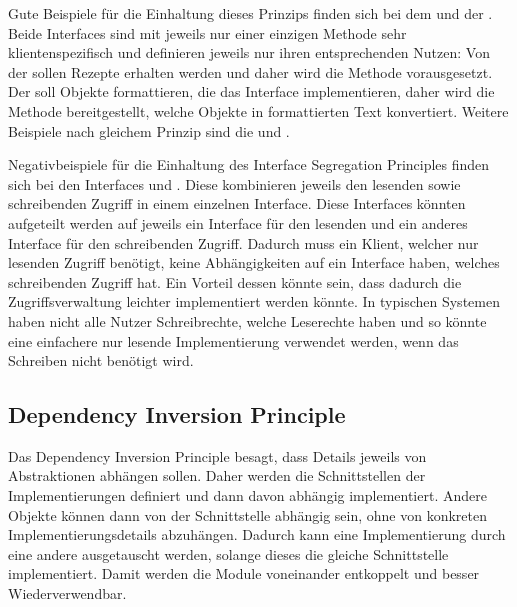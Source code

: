 Gute Beispiele für die Einhaltung dieses Prinzips finden sich bei dem  und der . Beide Interfaces sind mit jeweils nur einer einzigen Methode sehr klientenspezifisch und definieren jeweils nur ihren entsprechenden Nutzen: Von der  sollen Rezepte erhalten werden und daher wird die Methode  vorausgesetzt. Der  soll Objekte formattieren, die das Interface  implementieren, daher wird die Methode  bereitgestellt, welche Objekte in formattierten Text konvertiert. Weitere Beispiele nach gleichem Prinzip sind die  und . 

Negativbeispiele für die Einhaltung des Interface Segregation Principles finden sich bei den Interfaces  und . Diese kombinieren jeweils den lesenden sowie schreibenden Zugriff in einem einzelnen Interface. Diese Interfaces könnten aufgeteilt werden auf jeweils ein Interface für den lesenden und ein anderes Interface für den schreibenden Zugriff. Dadurch muss ein Klient, welcher nur lesenden Zugriff benötigt, keine Abhängigkeiten auf ein Interface haben, welches schreibenden Zugriff hat. Ein Vorteil dessen könnte sein, dass dadurch die Zugriffsverwaltung leichter implementiert werden könnte. In typischen Systemen haben nicht alle Nutzer Schreibrechte, welche Leserechte haben und so könnte eine einfachere nur lesende Implementierung verwendet werden, wenn das Schreiben nicht benötigt wird.

\subsection{Dependency Inversion Principle}
Das Dependency Inversion Principle besagt, dass Details jeweils von Abstraktionen abhängen sollen. Daher werden die Schnittstellen der Implementierungen definiert und dann davon abhängig implementiert. Andere Objekte können dann von der Schnittstelle abhängig sein, ohne von konkreten Implementierungsdetails abzuhängen. Dadurch kann eine Implementierung durch eine andere ausgetauscht werden, solange dieses die gleiche Schnittstelle implementiert. Damit werden die Module voneinander entkoppelt und besser Wiederverwendbar.

